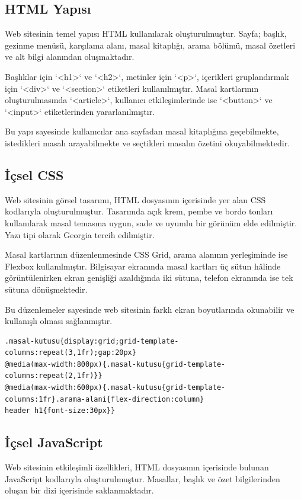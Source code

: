 \documentclass[12pt,a4paper]{article}
\begin{document}
\subsection{HTML Yapısı}
Web sitesinin temel yapısı HTML kullanılarak oluşturulmuştur. Sayfa; başlık, gezinme menüsü, karşılama alanı, masal kitaplığı, arama bölümü, masal özetleri ve alt bilgi alanından oluşmaktadır.

Başlıklar için `<h1>` ve `<h2>`, metinler için `<p>`, içerikleri gruplandırmak için `<div>` ve `<section>` etiketleri kullanılmıştır. Masal kartlarının oluşturulmasında `<article>`, kullanıcı etkileşimlerinde ise `<button>` ve `<input>` etiketlerinden yararlanılmıştır.

Bu yapı sayesinde kullanıcılar ana sayfadan masal kitaplığına geçebilmekte, istedikleri masalı arayabilmekte ve seçtikleri masalın özetini okuyabilmektedir.

\subsection{İçsel CSS}
Web sitesinin görsel tasarımı, HTML dosyasının içerisinde yer alan CSS kodlarıyla oluşturulmuştur. Tasarımda açık krem, pembe ve bordo tonları kullanılarak masal temasına uygun, sade ve uyumlu bir görünüm elde edilmiştir. Yazı tipi olarak Georgia tercih edilmiştir.

Masal kartlarının düzenlenmesinde CSS Grid, arama alanının yerleşiminde ise Flexbox kullanılmıştır. Bilgisayar ekranında masal kartları üç sütun hâlinde görüntülenirken ekran genişliği azaldığında iki sütuna, telefon ekranında ise tek sütuna dönüşmektedir.

Bu düzenlemeler sayesinde web sitesinin farklı ekran boyutlarında okunabilir ve kullanışlı olması sağlanmıştır.

\begin{lstlisting}[caption={Masal Kartlarının Duyarlı Sütun Düzeni}]
.masal-kutusu{display:grid;grid-template-columns:repeat(3,1fr);gap:20px}
@media(max-width:800px){.masal-kutusu{grid-template-columns:repeat(2,1fr)}}
@media(max-width:600px){.masal-kutusu{grid-template-columns:1fr}.arama-alani{flex-direction:column}
header h1{font-size:30px}}
\end{lstlisting}

\subsection{İçsel JavaScript}
Web sitesinin etkileşimli özellikleri, HTML dosyasının içerisinde bulunan JavaScript kodlarıyla oluşturulmuştur. Masallar, başlık ve özet bilgilerinden oluşan bir dizi içerisinde saklanmaktadır.
\end{document}
